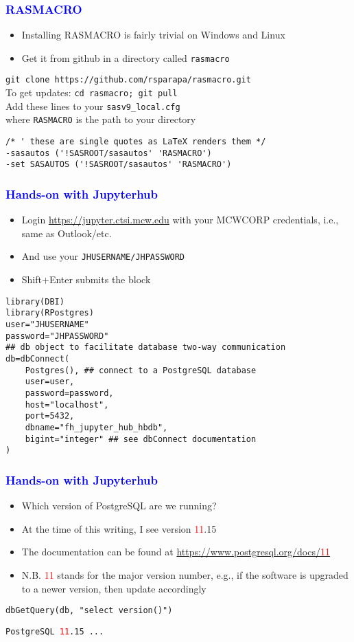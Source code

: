 \documentclass[11pt,pdftex,dvipsnames,usenames]{beamer}
\begin{document}
\begin{frame}[fragile]\frametitle{\bf\textcolor{blue}{RASMACRO}}
\begin{itemize}
\item Installing RASMACRO is fairly trivial on Windows and Linux
\item Get it from github in a directory called \texttt{rasmacro}
\end{itemize}
\texttt{git clone https://github.com/rsparapa/rasmacro.git} \\
To get updates: \texttt{cd rasmacro; git pull} \\
Add these lines to your \texttt{sasv9\_local.cfg} \\
where \texttt{RASMACRO} is the path to your directory 
\begin{verbatim}
/* ' these are single quotes as LaTeX renders them */
-sasautos ('!SASROOT/sasautos' 'RASMACRO') 
-set SASAUTOS ('!SASROOT/sasautos' 'RASMACRO')
\end{verbatim}
\end{frame}

\begin{frame}[fragile]\frametitle{\bf\textcolor{blue}{Hands-on with Jupyterhub}}
\begin{itemize}
\item Login \href{https://jupyter.ctsi.mcw.edu}{https://jupyter.ctsi.mcw.edu}
with your MCWCORP credentials, i.e., same as Outlook/etc.
\item And use your \texttt{JHUSERNAME/JHPASSWORD}
\item Shift+Enter submits the block
\end{itemize}
\begin{verbatim}
library(DBI)
library(RPostgres)
user="JHUSERNAME" 
password="JHPASSWORD"
## db object to facilitate database two-way communication
db=dbConnect(
    Postgres(), ## connect to a PostgreSQL database
    user=user,
    password=password,
    host="localhost", 
    port=5432, 
    dbname="fh_jupyter_hub_hbdb",
    bigint="integer" ## see dbConnect documentation
)
\end{verbatim}
\end{frame}

\begin{frame}[fragile]\frametitle{\bf\textcolor{blue}{Hands-on with Jupyterhub}}
\begin{itemize}
\item Which version of PostgreSQL are we running?
\item At the time of this writing, I see version \textcolor{red}{11}.15
\item The documentation can be found at
\href{https://www.postgresql.org/docs/11}
{https://www.postgresql.org/docs/\textcolor{red}{11}}
\item N.B. \textcolor{red}{11} stands for the major version number, e.g.,
if the software is upgraded to a newer version, then update accordingly
\end{itemize}
\begin{verbatim}
dbGetQuery(db, "select version()")
\end{verbatim}
\texttt{PostgreSQL \textcolor{red}{11}.15 ...}
\end{frame}
\end{document}
